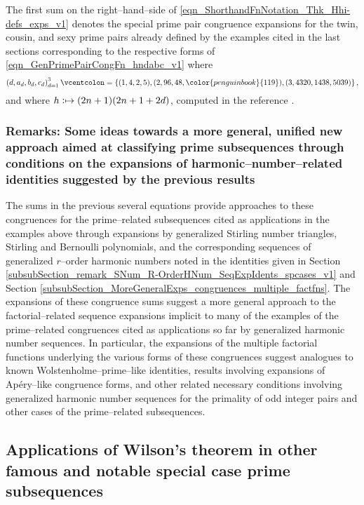\documentclass[12pt,reqno]{article}
\numberwithin{sfootnote}{section}
\numberwithin{equation}{section}
\theoremstyle{DefaultTheoremStyle}
\theoremstyle{definition}
\newcommand{\defequals}{\ensuremath{\vcentcolon=}}
\newcommand{\defmapsto}{\ensuremath{\vcentcolon\mapsto}}
\begin{document}
The first sum on the right--hand--side of 
\eqref{eqn_ShorthandFnNotation_Thk_Hhi-defs_exps_v1} 
denotes the special prime pair congruence expansions for the 
twin, cousin, and sexy prime pairs already defined by the 
examples cited in the last sections corresponding to the 
respective forms of \eqref{eqn_GenPrimePairCongFn_hndabc_v1} where 
\[\left(d, a_d, b_d, c_d\right)_{d=1}^{3} \defequals \left\{
 (1, 4, 2, 5), (2, 96, 48, {\color{penguinbook}{119}}), 
 (3, 4320, 1438, 5039) \right\}, 
\] 
and where $h \defmapsto (2n+1)(2n+1+2d)$, 
computed in the reference \citep{SUMMARYNBREF-STUB}. 

\subsubsection{Remarks: Some ideas towards a 
               more general, unified new 
               approach aimed at classifying 
               prime subsequences through conditions on the expansions of 
               harmonic--number--related identities 
               suggested by the previous results} 
\label{subsubSection_remark_MmCompsWith_the_SigmaPkg}

The sums in the previous several equations provide approaches to these 
congruences for the prime--related subsequences cited as 
applications in the examples above through expansions by 
generalized Stirling number triangles, Stirling and 
Bernoulli polynomials, and the 
corresponding sequences of generalized $r$--order harmonic numbers 
noted in the identities given in 
Section \ref{subsubSection_remark_SNum_R-OrderHNum_SeqExpIdents_spcases_v1} and 
Section \ref{subsubSection_MoreGeneralExps_congruences_multiple_factfns}. 
The expansions of these congruence sums suggest a 
more general approach to the factorial--related sequence expansions 
implicit to many of the examples of the prime--related congruences 
cited as applications so far by generalized harmonic number sequences. 
In particular, 
the expansions of the multiple factorial functions 
underlying the various forms of these congruences 
suggest analogues to known Wolstenholme--prime--like identities, 
results involving expansions of Ap\'{e}ry--like congruence forms, and 
other related necessary conditions involving 
generalized harmonic number sequences for the 
primality of odd integer pairs and other cases of the 
prime--related subsequences. 

\subsection{Applications of Wilson's theorem in 
            other famous and notable special case prime subsequences} 
\label{subsubSection-Examples_SomeResults_for_Prime_k-Tuples} 
\end{document}
